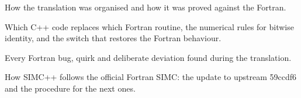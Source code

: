 \documentclass{simcpp}
\begin{document}
\simcfrontmatter



\simcmainmatter

  {How the translation was organised and how it was proved against the Fortran.}



  {Which C++ code replaces which Fortran routine, the numerical rules for bitwise identity, and the switch that restores the Fortran behaviour.}




  {Every Fortran bug, quirk and deliberate deviation found during the translation.}


  {How SIMC++ follows the official Fortran SIMC: the update to upstream 59ccdf6 and the procedure for the next ones.}


\simcappendix



\simcbackmatter
\end{document}
